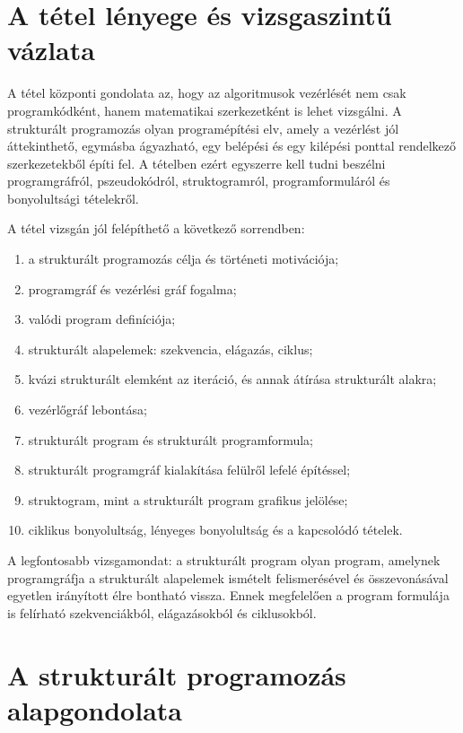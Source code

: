 \section{A tétel lényege és vizsgaszintű vázlata}

\begin{summarybox}
A tétel központi gondolata az, hogy az algoritmusok vezérlését nem csak programkódként, hanem matematikai szerkezetként is lehet vizsgálni. A strukturált programozás olyan programépítési elv, amely a vezérlést jól áttekinthető, egymásba ágyazható, egy belépési és egy kilépési ponttal rendelkező szerkezetekből építi fel. A tételben ezért egyszerre kell tudni beszélni programgráfról, pszeudokódról, struktogramról, programformuláról és bonyolultsági tételekről.
\end{summarybox}

A tétel vizsgán jól felépíthető a következő sorrendben:

\begin{enumerate}
  \item a strukturált programozás célja és történeti motivációja;
  \item programgráf és vezérlési gráf fogalma;
  \item valódi program definíciója;
  \item strukturált alapelemek: szekvencia, elágazás, ciklus;
  \item kvázi strukturált elemként az iteráció, és annak átírása strukturált alakra;
  \item vezérlőgráf lebontása;
  \item strukturált program és strukturált programformula;
  \item strukturált programgráf kialakítása felülről lefelé építéssel;
  \item struktogram, mint a strukturált program grafikus jelölése;
  \item ciklikus bonyolultság, lényeges bonyolultság és a kapcsolódó tételek.
\end{enumerate}

A legfontosabb vizsgamondat: a strukturált program olyan program, amelynek programgráfja a strukturált alapelemek ismételt felismerésével és összevonásával egyetlen irányított élre bontható vissza. Ennek megfelelően a program formulája is felírható szekvenciákból, elágazásokból és ciklusokból.

\section{A strukturált programozás alapgondolata}

